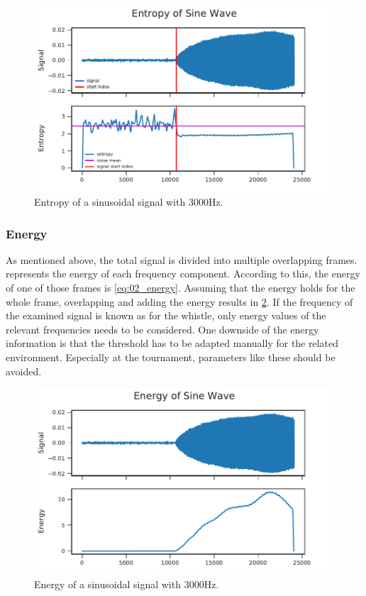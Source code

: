 \begin{figure}[ht]
	\centering
		\includegraphics[]{figures/sine_entropy}
	\caption{Entropy of a sinusoidal signal with 3000Hz.}
	\label{fig:03_entropy}
\end{figure}

\subsubsection*{Energy}

As mentioned above, the total signal is divided into multiple overlapping frames.
 represents the energy of each frequency
component.
According to this, the energy of one of those frames is \cref{eq:02_energy}.
Assuming that the energy holds for the whole frame, overlapping and adding the energy
results in \cref{fig:03_energy}.
If the frequency of the examined signal is known as for the whistle, only energy values
of the relevant frequencies needs to be considered.
One downside of the energy information is that the threshold has to be adapted
manually for the related environment.
Especially at the tournament, parameters like these should be avoided.

\begin{figure}[ht]
	\centering
		\includegraphics[]{figures/sine_energy}
	\caption{Energy of a sinusoidal signal with 3000Hz.}
	\label{fig:03_energy}
\end{figure}

